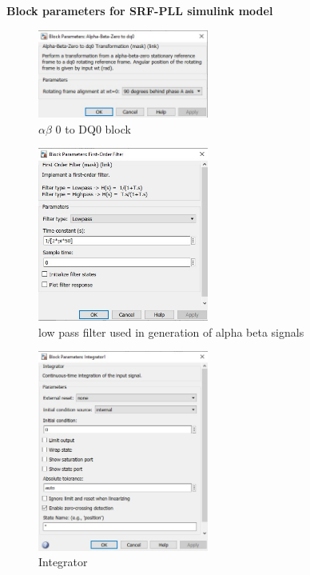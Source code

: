 \textbf{Block parameters for SRF-PLL simulink model}

\begin{figure}
    \centering
    \includegraphics[width=0.5\textwidth]{ab0 to dq0.jpg}
    \caption{$\alpha \beta$ 0 to DQ0 block}
    \label{alpha beta 0 to DQ0 block}
\end{figure}

\begin{figure}
    \centering
    \includegraphics[width=0.5\textwidth]{low pass filter.jpg}
    \caption{low pass filter used in generation of alpha beta signals}
    \label{low pass filter}
\end{figure}



\begin{figure}
    \centering
    \includegraphics[width=0.5\textwidth]{intergrator.jpg}
    \caption{Integrator}
    \label{Integrator}
\end{figure}

